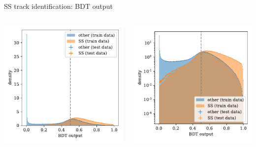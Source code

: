 \documentclass[aspectratio=1610, 10pt]{beamer}
\begin{document}
\begin{frame}{SS track identification: BDT output}
  \begin{columns}
    \begin{column}{0.5\textwidth}
      \centering
      \includegraphics[width=\textwidth]{images/backup/SS_output_normal.pdf}
    \end{column}
    \begin{column}{0.5\textwidth}
      \centering
      \includegraphics[width=\textwidth]{images/SS_output.pdf}
    \end{column}
  \end{columns}
\end{frame}
\end{document}
